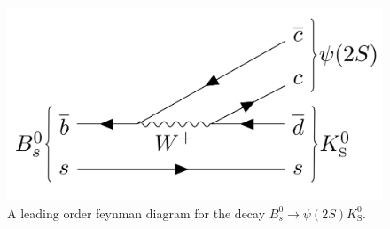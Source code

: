   \begin{figure}[!htb]
    \centering
    \includegraphics[width=12cm]{graphics/image.png}
    \caption{A leading order feynman diagram for the decay $B_s^0 \rightarrow \psi(2S) K^0_\mathrm{S}$. \cite{sample}}
    \label{f2}
  \end{figure}
